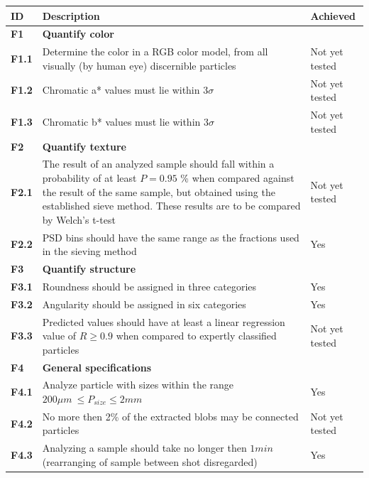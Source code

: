 \documentclass[11pt,fleqn,,a4paper,twoside,openright]{book}
\begin{document}
\begin{longtable}{|p{1cm}| p{9cm} p{2.5cm}|}
	\hline
	\textbf{ID} & \textbf{Description} & \textbf{Achieved} \\
	\endhead
	\hline
	\textbf{F1}\label{F1} & \textbf{Quantify color} &  \\
	\hline
	\textbf{F1.1}\label{F1.1} & Determine the color in a RGB color model, from all visually (by human eye) discernible particles & Not yet tested \\
	\hline
	\textbf{F1.2}\label{F1.2} & Chromatic a* values must lie within $3 \sigma$ & Not yet tested \\
	\hline
	\textbf{F1.3}\label{F1.3} & Chromatic b* values must lie within $3 \sigma$ & Not yet tested \\
	\hline
	\textbf{F2}\label{F2} & \textbf{Quantify texture} &  \\
	\hline
	\textbf{F2.1}\label{F2.1} & The result of an analyzed sample should fall within a probability of at least $P = 0.95$ \% when compared against the result of the same sample, but obtained using the established sieve method. These results are to be compared by Welch's t-test  &  Not yet tested \\
	\hline
	\textbf{F2.2}\label{F2.2} & PSD bins should have the same range as the fractions used in the sieving method & Yes \\
	\hline
	\textbf{F3}\label{F3} & \textbf{Quantify structure}  &  \\
	\hline
	\textbf{F3.1}\label{F3.1} & Roundness should be assigned in three categories  & Yes \\
	\hline
	\textbf{F3.2}\label{F3.2} & Angularity should be assigned in six categories  & Yes \\
	\hline
	\textbf{F3.3}\label{F3.3} & Predicted values should have at least a linear regression value of $ R \geq 0.9 $ when compared to expertly classified particles & Not yet tested  \\
	\hline
	\textbf{F4}\label{F4} & \textbf{General specifications} &  \\
	\hline
	\textbf{F4.1}\label{F4.1} & Analyze particle with sizes within the range $ 200 \mu m\ \leq P_{size} \leq 2 mm $& Yes \\
	\hline
	\textbf{F4.2}\label{F4.2} & No more then 2\% of the extracted blobs may be connected particles & Not yet tested \\
	\hline
	\textbf{F4.3}\label{F4.3} & Analyzing a sample should take no longer then $ 1 min$ (rearranging of sample between shot disregarded) & Yes\\

\end{longtable}
\end{document}
